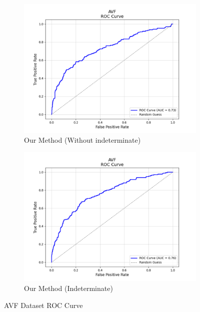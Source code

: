 \begin{figure}[H]
    \begin{subfigure}[b]{0.5\textwidth}
        \centering
        \includegraphics[width=\linewidth]{figures/AVF_method1_roc.png}
        \caption{Our Method (Without indeterminate)}
        \label{fig:pta-symptom-method1-roc}
    \end{subfigure}%
    \hfill
    \begin{subfigure}[b]{0.5\textwidth}
        \centering
        \includegraphics[width=\linewidth]{figures/AVF_method2_roc.png}
        \caption{Our Method (Indeterminate)}
        \label{fig:pta-symptom-method2-roc}
    \end{subfigure}

    \caption{AVF Dataset ROC Curve}
    \label{fig:combined}
\end{figure}

